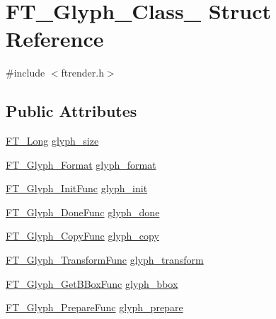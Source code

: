 \hypertarget{struct_f_t___glyph___class__}{\section{F\-T\-\_\-\-Glyph\-\_\-\-Class\-\_\- Struct Reference}
\label{struct_f_t___glyph___class__}
}


{\ttfamily \#include $<$ftrender.\-h$>$}

\subsection*{Public Attributes}
\begin{DoxyCompactItemize}
\item 
\hyperlink{fttypes_8h_a7fa72a1f0e79fb1860c5965789024d6f}{F\-T\-\_\-\-Long} \hyperlink{struct_f_t___glyph___class___a1a76c68b9fb0e93947e888c0fe77cbf8}{glyph\-\_\-size}
\item 
\hyperlink{ftimage_8h_aeca0d10a27aedecbf96515e0628aff1f}{F\-T\-\_\-\-Glyph\-\_\-\-Format} \hyperlink{struct_f_t___glyph___class___a26738bd14d5845e18d09ccaa3a709d23}{glyph\-\_\-format}
\item 
\hyperlink{ftrender_8h_a82f06475acaf83c888c239936e63017a}{F\-T\-\_\-\-Glyph\-\_\-\-Init\-Func} \hyperlink{struct_f_t___glyph___class___a657200ad15ff061b38fb25b168737f95}{glyph\-\_\-init}
\item 
\hyperlink{ftrender_8h_a9396e4d7c1305b4945c3f43c95323559}{F\-T\-\_\-\-Glyph\-\_\-\-Done\-Func} \hyperlink{struct_f_t___glyph___class___aabf05a4368dccacf45e1a54e542e5d63}{glyph\-\_\-done}
\item 
\hyperlink{ftrender_8h_a1e954343fedd1a8e322328ccaeb6af17}{F\-T\-\_\-\-Glyph\-\_\-\-Copy\-Func} \hyperlink{struct_f_t___glyph___class___afc78dcdc4802760ebcaccf3a7b6cd088}{glyph\-\_\-copy}
\item 
\hyperlink{ftrender_8h_a75edca5f9e9c964e364fbb7fe848d08f}{F\-T\-\_\-\-Glyph\-\_\-\-Transform\-Func} \hyperlink{struct_f_t___glyph___class___a5f72ac1d0d92eb31fa3e2bb721a97ef2}{glyph\-\_\-transform}
\item 
\hyperlink{ftrender_8h_a1b233ffd28134752d5da1aa1d2cd56fd}{F\-T\-\_\-\-Glyph\-\_\-\-Get\-B\-Box\-Func} \hyperlink{struct_f_t___glyph___class___a06bfad431865c6731305cb781f78b317}{glyph\-\_\-bbox}
\item 
\hyperlink{ftrender_8h_a3236bd42d7865521fe10137732c1d21b}{F\-T\-\_\-\-Glyph\-\_\-\-Prepare\-Func} \hyperlink{struct_f_t___glyph___class___af7f406e5ea20a6614c946746938830c9}{glyph\-\_\-prepare}
\end{DoxyCompactItemize}


